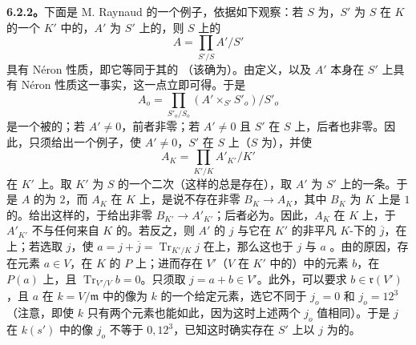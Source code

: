\textbf{6.2.2。}下面是 M. Raynaud 的一个例子，依据如下观察：若 $S$ 为，$S'$ 为 $S$ 在 $K$ 的一个 $K'$ 中的，$A'$ 为 $S'$ 上的，则 $S$ 上的
\[
A=\prod_{S'/S}A'/S'
\]
具有 Néron 性质，即它等同于其的 （该确为）。由定义，以及 $A'$ 本身在 $S'$ 上具有 Néron 性质这一事实，这一点立即可得。于是
\[
A_o=\prod_{S'_o/S_o}(A'\times_{S'}S'_o)/S'_o
\]
是一个被的；若 $A'\ne0$，前者非零；若 $A'\ne0$ 且 $S'$ 在 $S$ 上，后者也非零。因此，只须给出一个例子，使 $A'\ne0$，$S'$ 在 $S$ 上（$S$ 为），并使
\[
A_K=\prod_{K'/K}A'_{K'}/K'
\]
在 $K'$ 上。取 $K'$ 为 $S$ 的一个二次（这样的总是存在），取 $A'$ 为 $S'$ 上的一条。于是 $A$ 的为 $2$，而 $A_K$ 在 $K$ 上，是说不存在非零 $B_K\to A_K$，其中 $B_K$ 为 $K$ 上是 $1$ 的。给出这样的，于给出非零 $B_{K'}\to A'_{K'}$；后者必为。因此，$A_K$ 在 $K$ 上，于 $A'_{K'}$ 不与任何来自 $K$ 的。若反之，则 $A'$ 的 $j$ 与它在 $K'$ 的非平凡 $K$-下的 $\overline j$，在上；若选取 $j$，使 $a=j+\overline j=\operatorname{Tr}_{K'/K}j$ 在上，那么这也于 $j$ 与 $a$ 。由的原因，存在元素
$a\in V$，在 $K$ 的 $P$ 上；进而存在 $V'$（$V$ 在 $K'$ 中的）中的元素 $b$，在 $P(a)$ 上，且 $\operatorname{Tr}_{V'/V}b=0$。只须取 $j=a+b\in V'$。此外，可以要求 $b\in\mathfrak r(V')$，且 $a$ 在 $k=V/\mathfrak m$ 中的像为 $k$ 的一个给定元素，选它不同于 $j_o=0$ 和 $j_o=12^3$（注意，即使 $k$ 只有两个元素也能如此，因为这时上述两个 $j_o$ 值相同）。于是 $j$ 在 $k(s')$ 中的像 $j_o$ 不等于 $0,12^3$，已知这时确实存在 $S'$ 上以 $j$ 为的。

